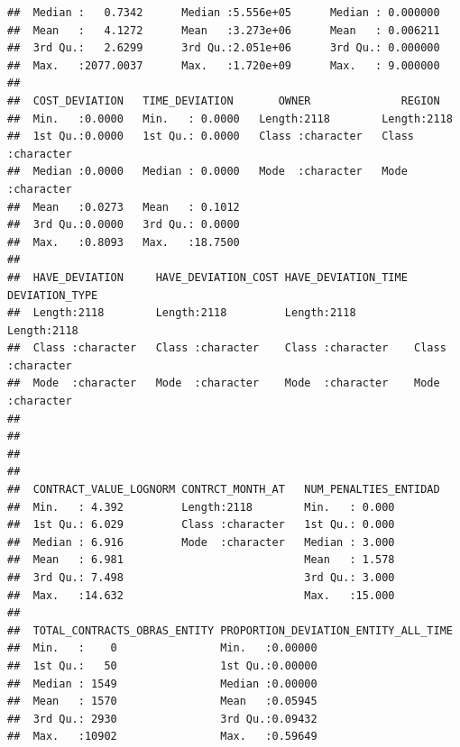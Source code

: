 \documentclass[
]{article}
\begin{document}
\begin{verbatim}
##  Median :   0.7342      Median :5.556e+05      Median : 0.000000  
##  Mean   :   4.1272      Mean   :3.273e+06      Mean   : 0.006211  
##  3rd Qu.:   2.6299      3rd Qu.:2.051e+06      3rd Qu.: 0.000000  
##  Max.   :2077.0037      Max.   :1.720e+09      Max.   : 9.000000  
##                                                                   
##  COST_DEVIATION   TIME_DEVIATION       OWNER              REGION         
##  Min.   :0.0000   Min.   : 0.0000   Length:2118        Length:2118       
##  1st Qu.:0.0000   1st Qu.: 0.0000   Class :character   Class :character  
##  Median :0.0000   Median : 0.0000   Mode  :character   Mode  :character  
##  Mean   :0.0273   Mean   : 0.1012                                        
##  3rd Qu.:0.0000   3rd Qu.: 0.0000                                        
##  Max.   :0.8093   Max.   :18.7500                                        
##                                                                          
##  HAVE_DEVIATION     HAVE_DEVIATION_COST HAVE_DEVIATION_TIME DEVIATION_TYPE    
##  Length:2118        Length:2118         Length:2118         Length:2118       
##  Class :character   Class :character    Class :character    Class :character  
##  Mode  :character   Mode  :character    Mode  :character    Mode  :character  
##                                                                               
##                                                                               
##                                                                               
##                                                                               
##  CONTRACT_VALUE_LOGNORM CONTRCT_MONTH_AT   NUM_PENALTIES_ENTIDAD
##  Min.   : 4.392         Length:2118        Min.   : 0.000       
##  1st Qu.: 6.029         Class :character   1st Qu.: 0.000       
##  Median : 6.916         Mode  :character   Median : 3.000       
##  Mean   : 6.981                            Mean   : 1.578       
##  3rd Qu.: 7.498                            3rd Qu.: 3.000       
##  Max.   :14.632                            Max.   :15.000       
##                                                                 
##  TOTAL_CONTRACTS_OBRAS_ENTITY PROPORTION_DEVIATION_ENTITY_ALL_TIME
##  Min.   :    0                Min.   :0.00000                     
##  1st Qu.:   50                1st Qu.:0.00000                     
##  Median : 1549                Median :0.00000                     
##  Mean   : 1570                Mean   :0.05945                     
##  3rd Qu.: 2930                3rd Qu.:0.09432                     
##  Max.   :10902                Max.   :0.59649                     

\end{verbatim}
\end{document}
